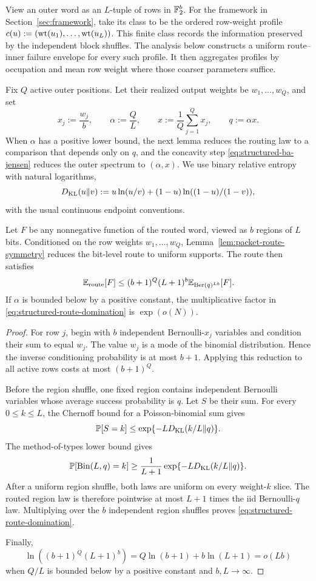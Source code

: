 View an outer word as an $L$-tuple of rows in $\mathbb F_2^b$. For the framework in
Section~\ref{sec:framework}, take its class to be the ordered row-weight
profile $c(u):=(\operatorname{wt}(u_1),\ldots,\operatorname{wt}(u_L))$.
This finite class records the information preserved by the independent block
shuffles. The analysis below constructs a uniform route--inner failure
envelope for every such profile. It then aggregates profiles by occupation and
mean row weight where those coarser parameters suffice.

Fix $Q$ active outer positions. Let their realized output weights be
$w_1,\ldots,w_Q$, and set
\[
  x_j:=\frac{w_j}{b},
  \qquad
  \alpha:=\frac QL,
  \qquad
  x:=\frac1Q\sum_{j=1}^Qx_j,
  \qquad
  q:=\alpha x.
\]
When $\alpha$ has a positive lower bound, the next lemma reduces the routing
law to a comparison that depends only on $q$, and the concavity step
\eqref{eq:structured-ba-jensen} reduces the outer spectrum to $(\alpha,x)$.
We use binary relative entropy with natural logarithms,
\[
 D_{\rm KL}(u\Vert v)
 :=u\ln(u/v)+(1-u)\ln((1-u)/(1-v)),
\]
with the usual continuous endpoint conventions.

\begin{lemma}
\label{lem:structured-route-domination}
Let $F$ be any nonnegative function of the routed word, viewed as $b$
regions of $L$ bits.
Conditioned on the row weights $w_1,\ldots,w_Q$, Lemma~\ref{lem:packet-route-symmetry}
reduces the bit-level route to uniform supports. The route then
satisfies
\begin{equation}
  \mathbb E_{\rm route}[F]
  \le
  (b+1)^Q(L+1)^b
  \mathbb E_{\operatorname{Ber}(q)^{Lb}}[F].
  \label{eq:structured-route-domination}
\end{equation}
If $\alpha$ is bounded below by a positive constant, the multiplicative
factor in \eqref{eq:structured-route-domination} is $\exp(o(N))$.
\end{lemma}

\begin{proof}
For row $j$, begin with $b$ independent Bernoulli-$x_j$ variables and
condition their sum to equal $w_j$. The value $w_j$ is a mode of the
binomial distribution. Hence the inverse conditioning probability is at
most $b+1$. Applying this reduction to all active rows costs at most
$(b+1)^Q$.

Before the region shuffle, one fixed region contains independent Bernoulli
variables whose average success probability is $q$. Let $S$ be their sum.
For every $0\le k\le L$, the Chernoff bound for a Poisson-binomial sum gives
\[
  \mathbb P[S=k]
  \le
  \exp\{-L D_{\rm KL}(k/L\Vert q)\}.
\]
The method-of-types lower bound gives
\[
  \mathbb P[\operatorname{Bin}(L,q)=k]
  \ge
  \frac1{L+1}
  \exp\{-L D_{\rm KL}(k/L\Vert q)\}.
\]
After a uniform region shuffle, both laws are uniform on every weight-$k$
slice. The routed region law is therefore pointwise at most $L+1$ times the
iid Bernoulli-$q$ law. Multiplying over the $b$ independent region shuffles
proves \eqref{eq:structured-route-domination}.

Finally,
\[
  \ln((b+1)^Q(L+1)^b)
  =Q\ln(b+1)+b\ln(L+1)=o(Lb)
\]
when $Q/L$ is bounded below by a positive constant and $b,L\to\infty$.
\end{proof}

